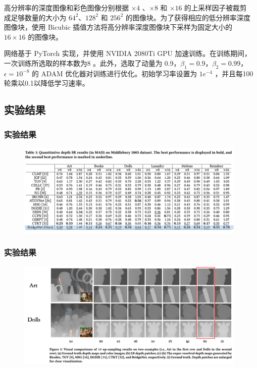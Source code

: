 \documentclass[aspectratio=169,12pt]{beamer}
\begin{document}
\begin{frame}[t]
\begin{columns}
\begin{column}{0.45\textwidth}
		\end{column}
	
	\end{columns}
	\footnotesize 高分辨率的深度图像和彩色图像分别根据 $\times4$ 、$\times 8$ 和 $\times 16$ 的上采样因子被裁剪成足够数量的大小为 $64^2$、$128^2$ 和 $256^2$ 的图像块。为了获得相应的低分辨率深度图像块，使用 Bicubic 插值方法将高分辨率深度图像块下采样为固定大小的 $16 \times 16$ 的图像块。
	
	网络基于 PyTorch 实现，并使用 NVIDIA 2080Ti GPU 加速训练。在训练期间，一次训练所选取的样本数为8 。此外，选取了动量为 0.9，$\beta_1=0.9$，$\beta_2=0.99$，$\epsilon=10^{−8}$ 的 ADAM 优化器对训练进行优化。初始学习率设置为 $1𝑒^{−4}$ ，并且每100轮乘以0.1以降低学习速率。
\end{frame}

\subsection{实验结果}
\begin{frame}[t]
	\frametitle{实验结果}
	\begin{figure}
		\includegraphics[scale=0.45]{22.png}
	\end{figure}
\end{frame}

\begin{frame}[t]
	\frametitle{实验结果}
	\begin{figure}
		\includegraphics[scale=0.45]{23.png}
	\end{figure}
\end{frame}
\end{document}
